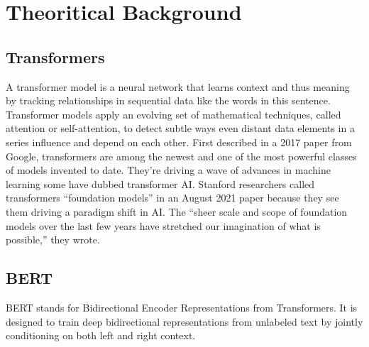 \chapter{Theoritical Background}
\section{Transformers}
        A transformer model is a neural network that learns context and thus meaning by tracking relationships in sequential data like the words in this sentence.
        Transformer models apply an evolving set of mathematical techniques, called attention or self-attention, to detect subtle ways even distant data elements in a series influence and depend on each other.
        First described in a 2017 paper from Google\cite{vaswani2023attention}, transformers are among the newest and one of the most powerful classes of models invented to date. They’re driving a wave of advances in machine learning some have dubbed transformer AI.
        Stanford researchers called transformers “foundation models” in an August 2021 paper\cite{bommasani2021opportunities} because they see them driving a paradigm shift in AI. The “sheer scale and scope of foundation models over the last few years have stretched our imagination of what is possible,” they wrote.


        \begin{figure}[hbt!]
        \end{figure}

\section{BERT}
    BERT stands for Bidirectional Encoder Representations from Transformers. It is designed to train deep bidirectional representations from unlabeled text by jointly conditioning on both left and right context.
        